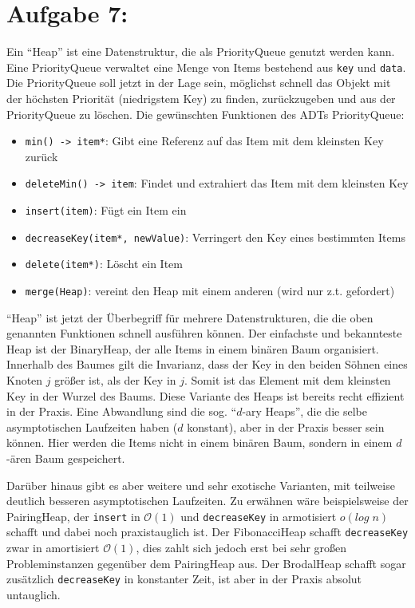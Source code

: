 \documentclass[11pt]{scrartcl} %
\newcommand{\func}[1]{\mbox{\texttt{#1}}}
\begin{document}
\section*{Aufgabe 7:}
Ein \enquote{Heap} ist eine Datenstruktur, die als PriorityQueue genutzt werden kann. Eine PriorityQueue verwaltet eine Menge von Items bestehend aus \func{key} und \func{data}. Die PriorityQueue soll jetzt in der Lage sein, möglichst schnell das Objekt mit der höchsten Priorität (niedrigstem Key) zu finden, zurückzugeben und aus der PriorityQueue zu löschen. Die gewünschten Funktionen des ADTs PriorityQueue:
\begin{itemize}
\item \func{min() -> item*}: Gibt eine Referenz auf das Item mit dem kleinsten Key zurück
\item \func{deleteMin() -> item}: Findet und extrahiert das Item mit dem kleinsten Key
\item \func{insert(item)}: Fügt ein Item ein
\item \func{decreaseKey(item*, newValue)}: Verringert den Key eines bestimmten Items
\item \func{delete(item*)}: Löscht ein Item
\item \func{merge(Heap)}: vereint den Heap mit einem anderen (wird nur z.t. gefordert)
\end{itemize}
\enquote{Heap} ist jetzt der Überbegriff für mehrere Datenstrukturen, die die oben genannten Funktionen schnell ausführen können.
Der einfachste und bekannteste Heap ist der BinaryHeap, der alle Items in einem binären Baum organisiert. Innerhalb des Baumes gilt die Invarianz, dass der Key in den beiden Söhnen eines Knoten $j$ größer ist, als der Key in $j$. Somit ist das Element mit dem kleinsten Key in der Wurzel des Baums. Diese Variante des Heaps ist bereits recht effizient in der Praxis. Eine Abwandlung sind die sog. \enquote{$d$-ary Heaps}, die die selbe asymptotischen Laufzeiten haben ($d$ konstant), aber in der Praxis besser sein können. Hier werden die Items nicht in einem binären Baum, sondern in einem $d$-ären Baum gespeichert.

Darüber hinaus gibt es aber weitere und sehr exotische Varianten, mit teilweise deutlich besseren asymptotischen Laufzeiten. Zu erwähnen wäre beispielsweise der PairingHeap, der \func{insert} in $\mathcal O(1)$ und \func{decreaseKey} in armotisiert $o(log\;n)$ schafft und dabei noch praxistauglich ist. Der FibonacciHeap schafft \func{decreaseKey} zwar in amortisiert $\mathcal O(1)$, dies zahlt sich jedoch erst bei sehr großen Probleminstanzen gegenüber dem PairingHeap aus. Der BrodalHeap schafft sogar zusätzlich \func{decreaseKey} in konstanter Zeit, ist aber in der Praxis absolut untauglich.
\end{document}
